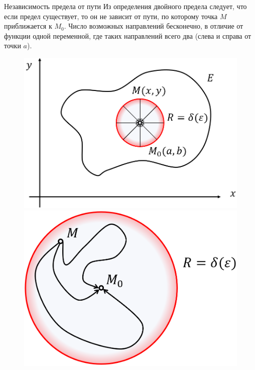 \begin{tbox}{Независимость предела от пути}
	Из определения двойного предела следует, что если предел существует, то он не зависит от пути, по которому точка \( M \) приближается к \( M_0 \). Число возможных направлений бесконечно, в отличие от функции одной переменной, где таких направлений всего два (слева и справа от точки \( a \)).
\end{tbox}

\begin{figure}[H]
	\centering
	\begin{minipage}{0.45\linewidth}
		\centering
		\includegraphics[width=0.9\linewidth]{image/screenshot009.png}
		\caption{ }
		\label{fig:1.3.2.1}
	\end{minipage}
	\begin{minipage}{0.45\linewidth}
		\centering
		\includegraphics[width=0.9\linewidth]{image/screenshot010.png}
		\caption{ }
		\label{fig:1.3.2.2}
	\end{minipage}
\end{figure}

